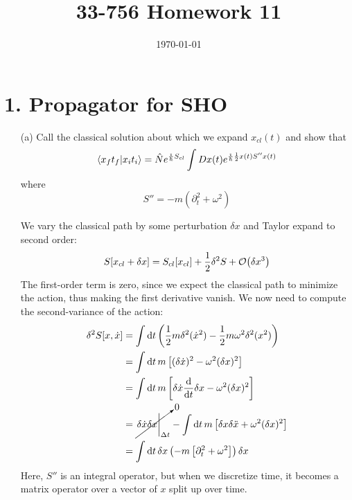 \documentclass[a4paper,twoside]{article}
\title{33-756 Homework 11}
\date{\today}
\begin{document}
\maketitle

\section*{1. Propagator for SHO}
\begin{itemize}
    \item[(a)] Call the classical solution about which we expand $ x_{cl}(t) $ and show that
        \begin{equation}
            \bra{x_f t_f}\ket{x_i t_i} = \hat{N} e^{\frac{\imath}{\hbar} S_{cl}} \int Dx(t) e^{\frac{\imath}{\hbar} \frac{1}{2} x(t) S'' x(t)}
        \end{equation}
        where
        \begin{equation}
            S'' = -m\left( \partial_t^2 + \omega^2 \right)
        \end{equation}
        \begin{problem}
            We vary the classical path by some perturbation $ \delta x $ and Taylor expand to second order:
            \begin{equation}
                S[x_{cl} + \delta x] = S_{cl}[x_{cl}] + \frac{1}{2} \delta^2S + \order{\delta x^3}
            \end{equation}
            The first-order term is zero, since we expect the classical path to minimize the action, thus making the first derivative vanish. We now need to compute the second-variance of the action:
            \begin{align}
                \delta^2 S[x, \dot{x}] &= \int \dd{t} \left( \frac{1}{2} m \delta^2(\dot{x}^2) - \frac{1}{2} m \omega^2 \delta^2(x^2) \right) \\
                &= \int \dd{t} m \left[ (\delta \dot{x})^2 - \omega^2(\delta x)^2 \right] \\
                &= \int \dd{t} m \left[\delta \dot{x} \dv{t} \delta x - \omega^2 (\delta x)^2\right] \\
                &= \cancelto{0}{\eval{\delta \dot{x} \delta x}_{\Delta t}} - \int \dd{t} m \left[ \delta x \delta\ddot{x} + \omega^2 (\delta x)^2 \right] \\
                &= \int \dd{t} \delta x \left( -m\left[ \partial_t^2 + \omega^2 \right] \right) \delta x
            \end{align}
            Here, $ S'' $ is an integral operator, but when we discretize time, it becomes a matrix operator over a vector of $ x $ split up over time.

\end{problem}
\end{itemize}
\end{document}
